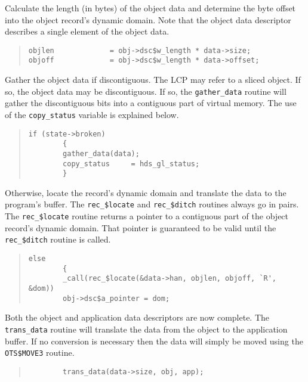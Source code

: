 Calculate the length (in bytes) of the object data and determine the byte
offset into the object record's dynamic domain. Note that the object data
descriptor describes a single element of the object data.

\begin {quote}
\begin {verbatim}
objlen             = obj->dsc$w_length * data->size;
objoff             = obj->dsc$w_length * data->offset;
\end{verbatim}
\end {quote}

Gather the object data if discontiguous. The LCP may refer to a sliced object.
If so, the object data may be discontiguous. If so, the {\tt gather\_data}
routine will gather the discontiguous bits into a contiguous part of virtual
memory. The use of the {\tt copy\_status} variable is explained below. 

\begin {quote}
\begin {verbatim}
if (state->broken)
        {
        gather_data(data);
        copy_status     = hds_gl_status;
        }
\end{verbatim}
\end {quote}

Otherwise, locate the record's dynamic domain and translate the data to the
program's buffer. The {\tt rec\_\$locate} and {\tt rec\_\$ditch} routines
always go in pairs. The {\tt rec\_\$locate} routine returns a pointer to a
contiguous part of the object record's dynamic domain. That pointer is
guaranteed to be valid until the {\tt rec\_\$ditch} routine is called. 

\begin {quote}
\begin {verbatim}
else
        {               
        _call(rec_$locate(&data->han, objlen, objoff, `R', &dom))
        obj->dsc$a_pointer = dom;
\end{verbatim}
\end {quote}

Both the object and application data descriptors are now complete. The {\tt
trans\_data} routine will translate the data from the object to the application
buffer. If no conversion is necessary then the data will simply be moved using
the {\tt OTS\$MOVE3} routine. 

\begin {quote}
\begin {verbatim}
        trans_data(data->size, obj, app);
\end{verbatim}
\end {quote}

